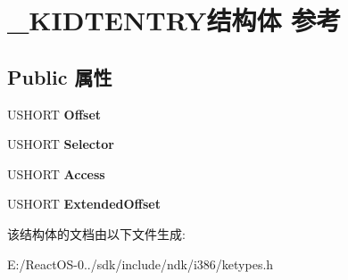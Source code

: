 \hypertarget{struct___k_i_d_t_e_n_t_r_y}{}\section{\+\_\+\+K\+I\+D\+T\+E\+N\+T\+R\+Y结构体 参考}
\label{struct___k_i_d_t_e_n_t_r_y}
\subsection*{Public 属性}
\begin{DoxyCompactItemize}
\item 
\mbox{\label{struct___k_i_d_t_e_n_t_r_y_a49dcff269aeaabacdc8ad8d10c71b72e}} 
U\+S\+H\+O\+RT {\bfseries Offset}
\item 
\mbox{\label{struct___k_i_d_t_e_n_t_r_y_a576f3c95b94d109a4b5ab2afb266007f}} 
U\+S\+H\+O\+RT {\bfseries Selector}
\item 
\mbox{\label{struct___k_i_d_t_e_n_t_r_y_a793720c98c2ffb095c168a94df0b86f8}} 
U\+S\+H\+O\+RT {\bfseries Access}
\item 
\mbox{\label{struct___k_i_d_t_e_n_t_r_y_abfecad0f5d8abebc15b7394b27f68d04}} 
U\+S\+H\+O\+RT {\bfseries Extended\+Offset}
\end{DoxyCompactItemize}


该结构体的文档由以下文件生成\+:\begin{DoxyCompactItemize}
\item 
E\+:/\+React\+O\+S-\/0../sdk/include/ndk/i386/ketypes.\+h\end{DoxyCompactItemize}
